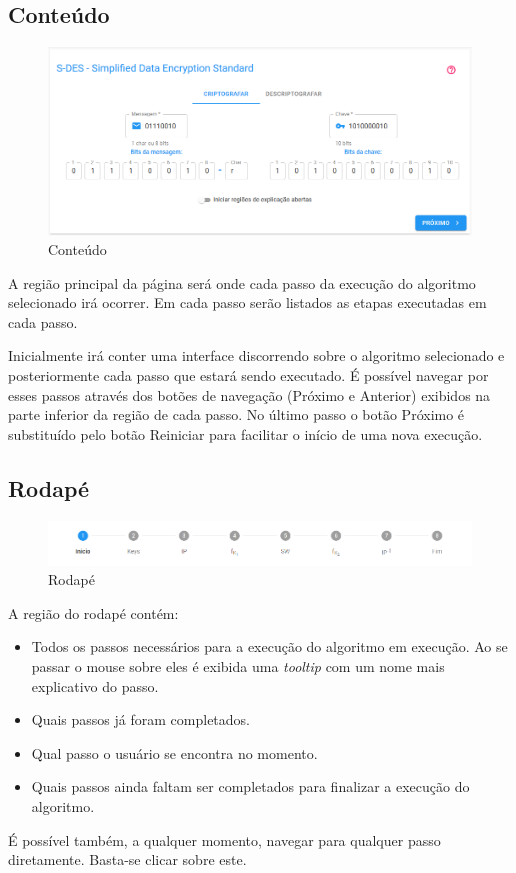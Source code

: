 \subsection{Conteúdo}

\begin{figure}[H]
    \centering
    \caption{Conteúdo}
    \includegraphics[width=1\linewidth]{UI/UIMain.png}
\end{figure}

A região principal da página será onde cada passo da execução do algoritmo selecionado irá ocorrer. Em cada passo serão listados as etapas executadas em cada passo.

Inicialmente irá conter uma interface discorrendo sobre o algoritmo selecionado e posteriormente cada passo que estará sendo executado. É possível navegar por esses passos através dos botões de navegação (Próximo e Anterior) exibidos na parte inferior da região de cada passo. No último passo o botão Próximo é substituído pelo botão Reiniciar para facilitar o início de uma nova execução.

\subsection{Rodapé}

\begin{figure}[H]
    \centering
    \caption{Rodapé}
    \includegraphics[width=1\linewidth]{UI/UIFooter.png}
\end{figure}

A região do rodapé contém:
\begin{itemize}
    \item Todos os passos necessários para a execução do algoritmo em execução. Ao se passar o mouse sobre eles é exibida uma \textit{tooltip} com um nome mais explicativo do passo.
    \item Quais passos já foram completados.
    \item Qual passo o usuário se encontra no momento.
    \item Quais passos ainda faltam ser completados para finalizar a execução do algoritmo.
\end{itemize}
É possível também, a qualquer momento, navegar para qualquer passo diretamente. Basta-se clicar sobre este.

